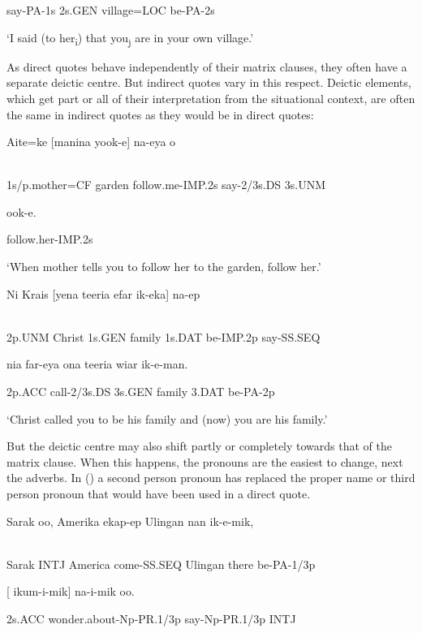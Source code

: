 say-PA-1s  2s.GEN  village=LOC  be-PA-2s

`I said (to her\textsubscript{i}) that you\textsubscript{j} are in your own village.'

As direct quotes behave independently of their matrix clauses, they often have a separate deictic centre. But indirect quotes vary in this respect. Deictic elements, which get part or all of their interpretation from the situational context, are often the same in indirect quotes as they would be in direct quotes: 

\ea%
\label{ex:x1584}
\gll Aite=ke  [manina  yook-e]  na-eya  o  \\
      \\
\glt
\z

1s/p.mother=CF  garden  follow.me-IMP.2s  say-2/3s.DS  3s.UNM

ook-e.

follow.her-IMP.2s

`When mother tells you to follow her to the garden, follow her.'

\ea%
\label{ex:x1280}
\gll Ni  Krais  [yena  teeria  efar  ik-eka]  na-ep  \\
      \\
\glt
\z

2p.UNM  Christ  1s.GEN  family  1s.DAT  be-IMP.2p  say-SS.SEQ

nia  far-eya  ona  teeria  wiar  ik-e-man.

2p.ACC  call-2/3s.DS  3s.GEN  family  3.DAT  be-PA-2p

`Christ called you to be his family and (now) you are his family.'

But the deictic centre may also shift partly or completely towards that of the matrix clause. When this happens, the pronouns are the easiest to change, next the adverbs. In () a second person pronoun has replaced the proper name or third person pronoun that would have been used in a direct quote.

\ea%
\label{ex:x1586}
\gll Sarak  oo,  Amerika  ekap-ep  Ulingan  nan  ik-e-mik,  \\
      \\
\glt
\z

Sarak  INTJ  America  come-SS.SEQ  Ulingan  there  be-PA-1/3p

[  ikum-i-mik]  na-i-mik  oo.

2s.ACC  wonder.about-Np-PR.1/3p  say-Np-PR.1/3p  INTJ

